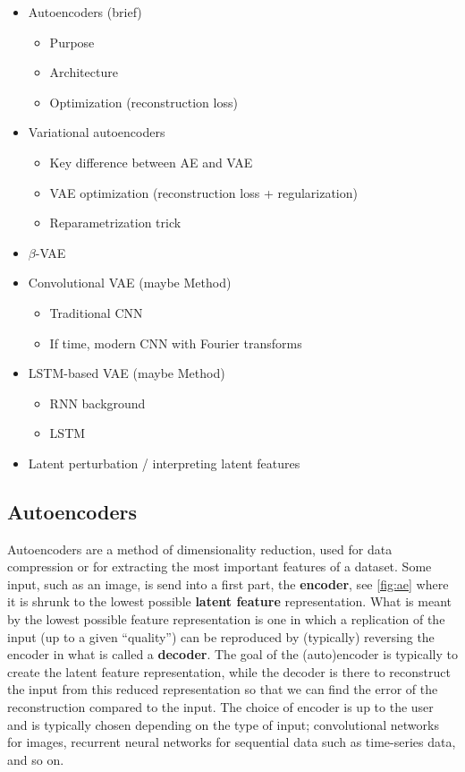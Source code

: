 \begin{itemize}
    \item Autoencoders (brief)
    \begin{itemize}
        \item Purpose
        \item Architecture
        \item Optimization (reconstruction loss)
    \end{itemize}
    \item Variational autoencoders
    \begin{itemize}
        \item Key difference between AE and VAE
        \item VAE optimization (reconstruction loss + regularization)
        \item Reparametrization trick
    \end{itemize}
    \item $\beta$-VAE
    \item Convolutional VAE (maybe Method)
    \begin{itemize}
        \item Traditional CNN
        \item If time, modern CNN with Fourier transforms
    \end{itemize}
    \item LSTM-based VAE (maybe Method)
    \begin{itemize}
        \item RNN background
        \item LSTM
    \end{itemize}
    \item Latent perturbation / interpreting latent features 
\end{itemize}

\subsection{Autoencoders}
Autoencoders are a method of dimensionality reduction, used for data compression or for extracting the most important features of a dataset. Some input, such as an image, is send into a first part, the \textbf{encoder}, see \autoref{fig:ae} where it is shrunk to the lowest possible \textbf{latent feature} representation. What is meant by the lowest possible feature representation is one in which a replication of the input (up to a given “quality”) can be reproduced by (typically) reversing the encoder in what is called a \textbf{decoder}. The goal of the (auto)encoder is typically to create the latent feature representation, while the decoder is there to reconstruct the input from this reduced representation so that we can find the error of the reconstruction compared to the input. The choice of encoder is up to the user and is typically chosen depending on the type of input; convolutional networks for images, recurrent neural networks for sequential data such as time-series data, and so on.

